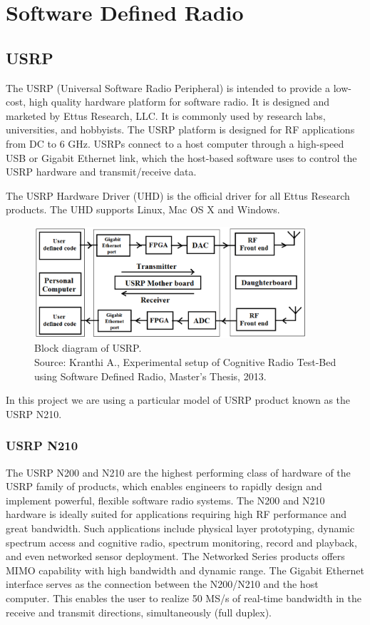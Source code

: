 \chapter{Software Defined Radio}



\section{USRP}

The USRP (Universal Software Radio Peripheral) is intended to provide a 
low-cost, high quality hardware platform for software radio. It is designed
and marketed by Ettus Research, LLC. It is commonly used by research labs,
universities, and hobbyists. The USRP platform is designed for RF applications
from DC to 6 GHz. USRPs connect to a host computer through a high-speed USB or
Gigabit Ethernet link, which the host-based software uses to control the USRP
hardware and transmit/receive data.

The USRP Hardware Driver (UHD) is the official driver for all Ettus Research
products. The UHD supports Linux, Mac OS X and Windows.

\begin{figure}
\centering
\includegraphics[width=0.9\textwidth]{usrpBlock}
\caption[Block diagram of USRP]{Block diagram of USRP.\\
\footnotesize{Source: Kranthi A., Experimental setup of Cognitive Radio 
Test-Bed using Software Defined Radio, Master's Thesis, 2013.}}
\label{usrpBlock}
\end{figure}

In this project we are using a particular model of USRP product known as the
USRP N210.

\subsection{USRP N210}

The USRP N200 and N210 are the highest performing class of hardware of the 
USRP family of products, which enables engineers to rapidly design and 
implement powerful, flexible software radio systems. The N200 and N210 
hardware is ideally suited for applications requiring high RF performance and
great bandwidth. Such applications include physical layer prototyping, dynamic
spectrum access and cognitive radio, spectrum monitoring, record and playback,
and even networked sensor deployment. The Networked Series products offers 
MIMO capability with high bandwidth and dynamic range. The Gigabit Ethernet
interface serves as the connection between the N200/N210 and the host 
computer. This enables the user to realize 50 MS/s of real-time bandwidth in 
the receive and transmit directions, simultaneously (full duplex).


